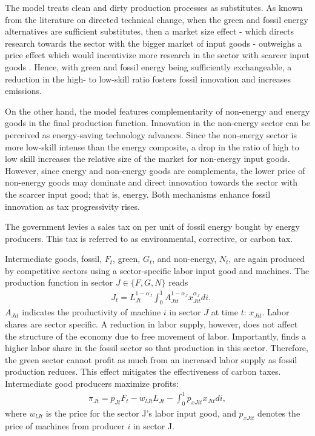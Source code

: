 The model treats clean and dirty production processes as substitutes. As known from the literature on directed technical change, when the green and fossil energy alternatives are sufficient substitutes, then a market size effect - which directs research towards the sector with the bigger market of input goods - outweighs a price effect which would incentivize more research in the sector with scarcer input goods \citep{Hemous2021DirectedEconomics}. Hence, with green and fossil energy being sufficiently exchangeable, a reduction in the high- to low-skill ratio fosters fossil innovation and increases emissions. 

On the other hand, the model features complementarity of non-energy and energy goods in the final production function. Innovation in the non-energy sector can be perceived as energy-saving technology advances. Since the non-energy sector is more low-skill intense than the energy composite, a drop in the ratio of high to low skill increases the relative size of the market for non-energy input goods. However, since energy and non-energy goods are complements, the lower price of non-energy goods may dominate and direct innovation towards the sector with the scarcer input good; that is, energy.
Both mechanisms enhance fossil innovation as tax progressivity rises. 

The government levies a sales tax on per unit of fossil energy bought by energy producers. This tax is referred to as environmental, corrective, or carbon tax. 

Intermediate goods, fossil, $F_t$, green, $G_t$, and non-energy, $N_t$, are again produced by competitive sectors using a sector-specific labor input good and machines. The production function in sector $J\in \{F,G,N\}$ reads
\begin{align}
&J_{t}= L_{Jt}^{1-\alpha_J}\int_{0}^{1}A_{Jit}^{1-\alpha_J}x_{Jit}^{\alpha_J} di.
\end{align}
$A_{Jit}$ indicates the productivity of machine $i$ in sector $J$ at time $t$: $x_{Jit}$. 
Labor shares are sector specific. A reduction in labor supply, however, does not affect the structure of the economy due to free movement of labor. 
Importantly, 
\cite{Fried2018ClimateAnalysis} finds a higher labor share in the fossil sector so that production in this sector. 
Therefore, the green sector cannot profit as much from an increased labor supply as fossil production reduces. This effect mitigates the effectiveness of carbon taxes. 
Intermediate good producers maximize profits: 
\begin{align}
\pi_{Jt}=p_{Jt}F_t-w_{lJt}L_{Jt}-\int_{0}^{1}p_{xJit}x_{Jit}di,
\end{align}
where $w_{lJt}$ is the price for the sector J's labor input good, and $p_{xJit}$ denotes the price of machines from producer $i$ in sector J. 


